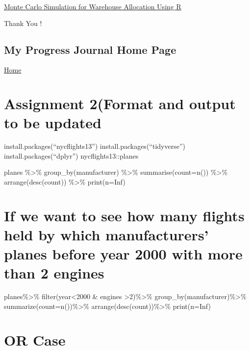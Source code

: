 \documentclass[
  letterpaper,
  DIV=11,
  numbers=noendperiod]{scrreprt}
\begin{document}
\href{https://www.supplychaindataanalytics.com/monte-carlo-simulation-in-r-for-warehouse-location-risk-assessment/}{Monte
Carlo Simulation for Warehouse Allocation Using R}

Thank You !

\hypertarget{my-progress-journal-home-page}{%
\section{My Progress Journal Home
Page}\label{my-progress-journal-home-page}}

\href{https://pjournal.github.io/mef06-yeneralboga/}{Home}


\hypertarget{assignment-2format-and-output-to-be-updated}{%
\chapter{Assignment 2(Format and output to be
updated}\label{assignment-2format-and-output-to-be-updated}}

install.packages(``nycflights13'') install.packages(``tidyverse'')
install.packages(``dplyr'') nycflights13::planes

planes \%\textgreater\% group\_by(manufacturer) \%\textgreater\%
summarise(count=n()) \%\textgreater\% arrange(desc(count))
\%\textgreater\% print(n=Inf)


\hypertarget{if-we-want-to-see-how-many-flights-held-by-which-manufacturers-planes-before-year-2000-with-more-than-2-engines}{%
\chapter{If we want to see how many flights held by which manufacturers'
planes before year 2000 with more than 2
engines}\label{if-we-want-to-see-how-many-flights-held-by-which-manufacturers-planes-before-year-2000-with-more-than-2-engines}}

planes\%\textgreater\% filter(year\textless2000 \& engines
\textgreater2)\%\textgreater\% group\_by(manufacturer)\%\textgreater\%
summarize(count=n())\%\textgreater\%
arrange(desc(count))\%\textgreater\% print(n=Inf)


\hypertarget{or-case}{%
\chapter{OR Case}\label{or-case}}
\end{document}
